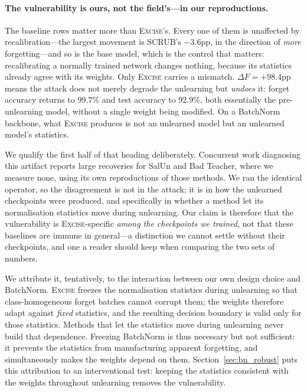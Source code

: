 \documentclass{article}
\newcommand{\ours}{\textsc{Excise}}
\newcommand{\added}[1]{{\color{revised}#1}}
\theoremstyle{remark}
\theoremstyle{plain}
\begin{document}
\paragraph{The vulnerability is ours, not the field's---in our reproductions.}
The baseline rows matter more than \ours{}'s. Every one of them is unaffected by
recalibration---the largest movement is SCRUB's $-3.6$pp, in the direction of
\emph{more} forgetting---and so is the base model, which is the control that
matters: recalibrating a normally trained network changes nothing, because its
statistics already agree with its weights. Only \ours{} carries a mismatch.
$\Delta F = +98.4$pp means the attack does not merely degrade the unlearning but
\emph{undoes} it: forget accuracy returns to $99.7\%$ and test accuracy to
$92.9\%$, both essentially the pre-unlearning model, without a single weight
being modified. On a BatchNorm backbone, what \ours{} produces is not an
unlearned model but an unlearned model's statistics.

We qualify the first half of that heading deliberately. Concurrent work
diagnosing this artifact reports large recoveries for SalUn and Bad Teacher,
where we measure none, using its own reproductions of those methods. We ran the
identical operator, so the disagreement is not in the attack; it is in how the
unlearned checkpoints were produced, and specifically in whether a method let
its normalisation statistics move during unlearning. Our claim is therefore that
the vulnerability is \ours{}-specific \emph{among the checkpoints we trained},
not that these baselines are immune in general---a distinction we cannot settle
without their checkpoints, and one a reader should keep when comparing the two
sets of numbers.

We attribute it, tentatively, to the interaction between our own design choice
and BatchNorm. \ours{} freezes the normalisation statistics during unlearning so
that class-homogeneous forget batches cannot corrupt them; the weights therefore
adapt against \emph{fixed} statistics, and the resulting decision boundary is
valid only for those statistics. Methods that let the statistics move during
unlearning never build that dependence. Freezing BatchNorm is thus necessary but
not sufficient: it prevents the statistics from manufacturing apparent
forgetting, and simultaneously makes the weights depend on them.
\added{Section~\ref{sec:bn_robust} puts this attribution to an interventional
test: keeping the statistics consistent with the weights throughout unlearning
removes the vulnerability.}
\end{document}
